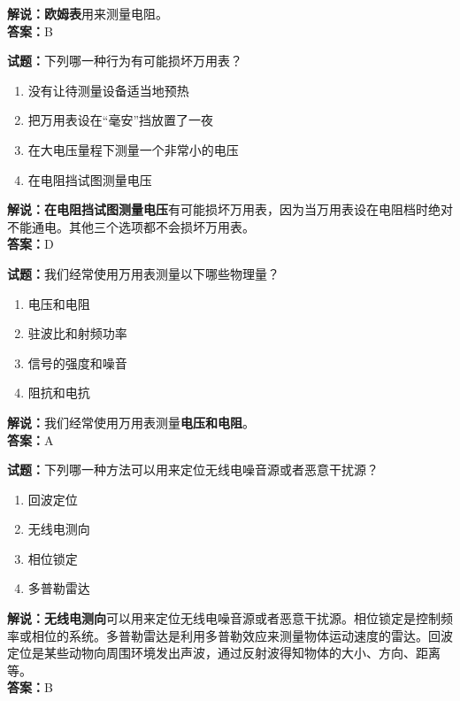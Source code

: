 \documentclass{ctexbook}
\begin{document}
\noindent\textbf{解说：欧姆表}用来测量电阻。\\\noindent\textbf{答案：}B

\vspace{\baselineskip}

\noindent\textbf{试题：}下列哪一种行为有可能损坏万用表？

\begin{enumerate}[leftmargin=3em]
  \item 没有让待测量设备适当地预热
  \item 把万用表设在“毫安”挡放置了一夜
  \item 在大电压量程下测量一个非常小的电压
  \item 在电阻挡试图测量电压
\end{enumerate}

\noindent\textbf{解说：在电阻挡试图测量电压}有可能损坏万用表，因为当万用表设在电阻档时绝对不能通电。其他三个选项都不会损坏万用表。\\\noindent\textbf{答案：}D

\vspace{\baselineskip}

\noindent\textbf{试题：}我们经常使用万用表测量以下哪些物理量？

\begin{enumerate}[leftmargin=3em]
  \item 电压和电阻
  \item 驻波比和射频功率
  \item 信号的强度和噪音
  \item 阻抗和电抗
\end{enumerate}

\noindent\textbf{解说：}我们经常使用万用表测量\textbf{电压和电阻}。\\\noindent\textbf{答案：}A

\vspace{\baselineskip}

\noindent\textbf{试题：}下列哪一种方法可以用来定位无线电噪音源或者恶意干扰源？

\begin{enumerate}[leftmargin=3em]
  \item 回波定位
  \item 无线电测向
  \item 相位锁定
  \item 多普勒雷达
\end{enumerate}

\noindent\textbf{解说：}\textbf{无线电测向}可以用来定位无线电噪音源或者恶意干扰源。相位锁定是控制频率或相位的系统。多普勒雷达是利用多普勒效应来测量物体运动速度的雷达。回波定位是某些动物向周围环境发出声波，通过反射波得知物体的大小、方向、距离等。\\
\noindent\textbf{答案：}B
\end{document}

